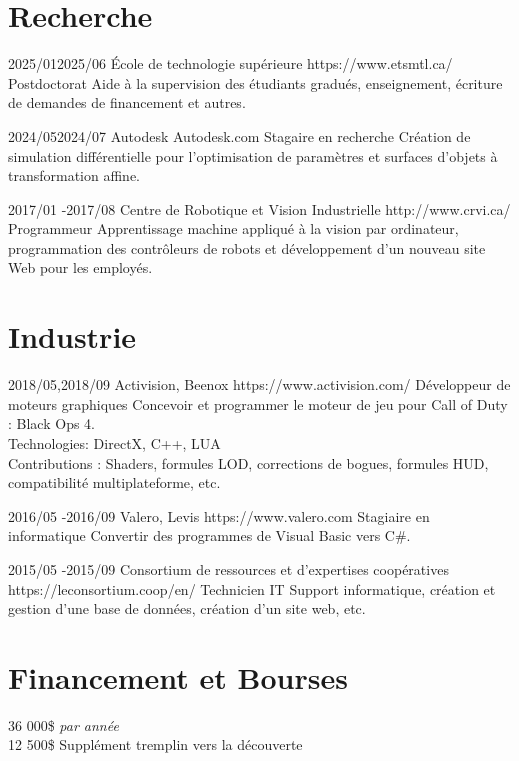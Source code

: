 \documentclass[10pt]{article} %
\begin{document}
\section{Recherche}
\job
{2025/01}{2025/06}
{École de technologie supérieure}
{https://www.etsmtl.ca/}
{Postdoctorat}
{Aide à la supervision des étudiants gradués, enseignement, écriture de demandes de financement et autres. }

\job
{2024/05}{2024/07}
{Autodesk}
{Autodesk.com}
{Stagaire en recherche}
{Création de simulation différentielle pour l'optimisation de paramètres et surfaces d'objets à transformation affine.}

\job
{2017/01 -}{2017/08}
{Centre de Robotique et Vision Industrielle}
{http://www.crvi.ca/}
{Programmeur}
{Apprentissage machine appliqué à la vision par ordinateur, programmation des contrôleurs de robots et développement d'un nouveau
site Web pour les employés.}

\section{Industrie}
\job
{2018/05,}{2018/09}
{Activision, Beenox}
{https://www.activision.com/}
{Développeur de moteurs graphiques}
{Concevoir et programmer le moteur de jeu pour Call of Duty : Black Ops 4.\\
 Technologies: DirectX, C++, LUA \\
 Contributions : Shaders, formules LOD, corrections de bogues, formules HUD, compatibilité multiplateforme, etc.}

\job
{2016/05 -}{2016/09}
{Valero, Levis}
{https://www.valero.com}
{Stagiaire en informatique}
{Convertir des programmes de Visual Basic vers C\#.}

\job
{2015/05 -}{2015/09}
{Consortium de ressources et d'expertises coopératives}
{https://leconsortium.coop/en/}
{Technicien IT}
{Support informatique, création et gestion d'une base de données, création d'un site web, etc.}


\section{Financement et Bourses}

{
 36 000\$ \textit{par année} \\
 12 500\$ Supplément tremplin vers la découverte \\
}
\end{document}

